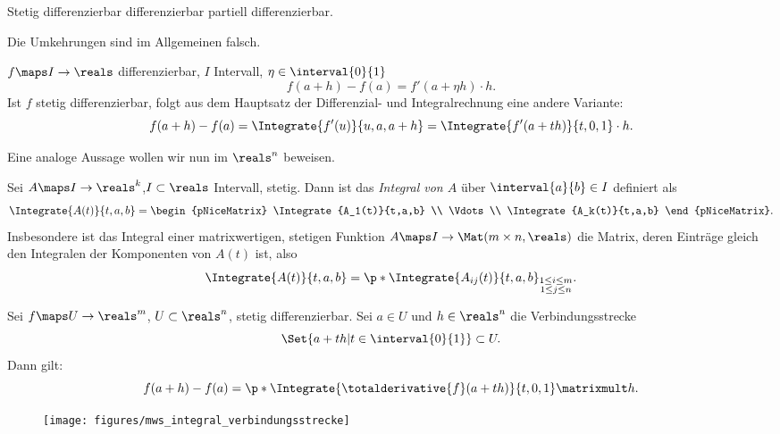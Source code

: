 \begin{bemerkung*}
    Stetig differenzierbar \timplies differenzierbar \timplies partiell differenzierbar.

    Die Umkehrungen sind im Allgemeinen falsch.
\end{bemerkung*}
\begin{bemerkung*}
    \( f\maps I\to \reals \) differenzierbar, \( I \) Intervall, \texists \( \eta\in \interval{0}{1} \) \sd
    \begin{equation*}
        f(a+h)-f(a)=f'(a+\eta h)\cdot h.
    \end{equation*}
    Ist \( f \) stetig differenzierbar, folgt aus dem Hauptsatz der Differenzial- und Integralrechnung eine andere Variante:
    \begin{equation*}
        f(a+h)-f(a)=\Integrate{f'(u)}{u,a,a+h}=\Integrate{f'(a+th)}{t,0,1}\cdot h.
    \end{equation*}
\end{bemerkung*}
Eine analoge Aussage wollen wir nun im \( \reals^n \) beweisen.
\begin{definition*}
    Sei \( A\maps I\to \reals^k \),\( I\subset \reals \) Intervall, stetig. Dann ist das \emph{Integral von \( A \)} über \( \interval{a}{b}\in I \) definiert als
    \begin{equation*}
        \Integrate{A(t)}{t,a,b}=\begin{pNiceMatrix} \Integrate{A_1(t)}{t,a,b} \\ \Vdots \\ \Integrate{A_k(t)}{t,a,b} \end{pNiceMatrix}.
    \end{equation*}
    Insbesondere ist das Integral einer matrixwertigen, stetigen Funktion \( A\maps I\to \Mat(m\times n,\reals) \) die Matrix, deren Einträge gleich den Integralen der Komponenten von \( A(t) \) ist, also
    \begin{equation*}
        \Integrate{A(t)}{t,a,b}=\p*{ \Integrate{A_{ij}(t)}{t,a,b} }_{\substack{1\leq i\leq m\\1\leq j\leq n}}.
    \end{equation*}
\end{definition*}
\begin{satz}\label{verbindungsstrecke_integral_mws}
    Sei \( f\maps U\to \reals^m \), \( U\subset \reals^n \), stetig differenzierbar. Sei \( a\in U \) und \( h\in \reals^n \) \sd  die Verbindungsstrecke
    \begin{equation*}
        \Set{a+th|t\in \interval{0}{1}}\subset U.
    \end{equation*}
    Dann gilt:
    \begin{equation*}
        f(a+h)-f(a)=\p*{ \Integrate{\totalderivative{f}(a+th)}{t,0,1} }\matrixmult h.
    \end{equation*}
    \begin{figure}[H]
        \centering
        \texttt{[image: figures/mws\_integral\_verbindungsstrecke]}
        \label{fig:mws_integral_verbindungsstrecke}
    \end{figure}
\end{satz}
